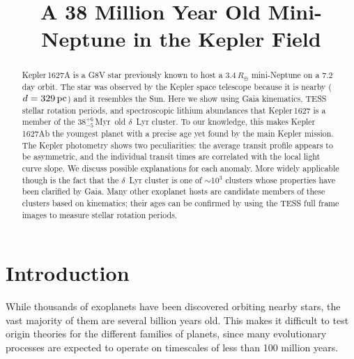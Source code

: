 \documentclass[12pt,modern,twocolumn,tighten]{aastex63}
\newcommand{\clusterage}{$38^{+6}_{-5}$\,Myr} %
\begin{document}
\title{
  A 38 Million Year Old Mini-Neptune in the Kepler Field
}



\begin{abstract}
  Kepler\,1627A is a G8V star previously known to host a
  $3.4\,R_\oplus$ mini-Neptune on a 7.2\,day orbit.  The star was
  observed by the Kepler space telescope because it is nearby
  ($d=329\,{\rm pc}$) and it resembles the Sun.  Here we show
  using Gaia kinematics, TESS stellar rotation periods, and
  spectroscopic lithium abundances that Kepler\,1627 is a member of
  the \clusterage\ old $\delta$~Lyr cluster.  To our knowledge, this makes
  Kepler\,1627Ab the youngest planet with a precise age yet found
  by the main Kepler mission.
  The Kepler photometry shows two 
  peculiarities: the average transit profile appears to be
  asymmetric, and the individual transit times are correlated with the
  local light curve slope.
  We discuss possible explanations for each anomaly.
  More widely applicable though is the fact that the $\delta$~Lyr
  cluster is one of $\sim$10$^3$ clusters whose properties have been
  clarified by Gaia.  Many other exoplanet hosts are candidate
  members of these clusters based on kinematics; their ages can
  be confirmed by using the TESS full frame images to
  measure stellar rotation periods.
\end{abstract}




\section{Introduction}

While thousands of exoplanets have been discovered orbiting nearby
stars, the vast majority of them are several billion years old.  This
makes it difficult to test origin theories for the different families
of planets, since many evolutionary processes are expected to operate
on timescales of less than 100 million years.
\end{document}

